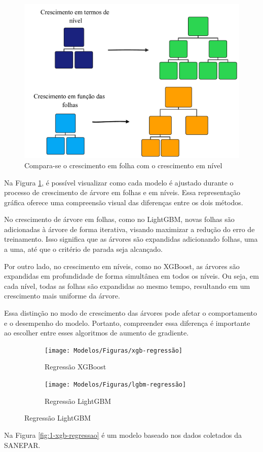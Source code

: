 \begin{figure}[H]
	\centering
	\caption{Compara-se o crescimento em folha com o crescimento em nível}
	\label{fig:xgboost}
	\includegraphics[width=1\linewidth]{Modelos/Figuras/xgboost}
	
\end{figure}


Na Figura \ref{fig:xgboost}, é possível visualizar como cada modelo é ajustado durante o processo de crescimento de árvore em folhas e em níveis. Essa representação gráfica oferece uma compreensão visual das diferenças entre os dois métodos.

No crescimento de árvore em folhas, como no LightGBM, novas folhas são adicionadas à árvore de forma iterativa, visando maximizar a redução do erro de treinamento. Isso significa que as árvores são expandidas adicionando folhas, uma a uma, até que o critério de parada seja alcançado.

Por outro lado, no crescimento em níveis, como no XGBoost, as árvores são expandidas em profundidade de forma simultânea em todos os níveis. Ou seja, em cada nível, todas as folhas são expandidas ao mesmo tempo, resultando em um crescimento mais uniforme da árvore.

Essa distinção no modo de crescimento das árvores pode afetar o comportamento e o desempenho do modelo. Portanto, compreender essa diferença é importante ao escolher entre esses algoritmos de aumento de gradiente.

\begin{figure}[H]
	\centering
	\caption{A performance da regressão utilizando XGBoost e LightGBM é comparada}
	\label{fig:1-xgb-regressao}
	
	\begin{subfigure}{1\textwidth}
		\texttt{[image: Modelos/Figuras/xgb-regressão]}
		\caption{Regressão XGBoost}	
	\end{subfigure}\hfill
	\begin{subfigure}{1\textwidth}
		\texttt{[image: Modelos/Figuras/lgbm-regressão]}
		\caption{Regressão LightGBM}	
	\end{subfigure}
	

\end{figure}	


Na Figura \ref{fig:1-xgb-regressao} é um modelo baseado nos dados coletados da SANEPAR.

